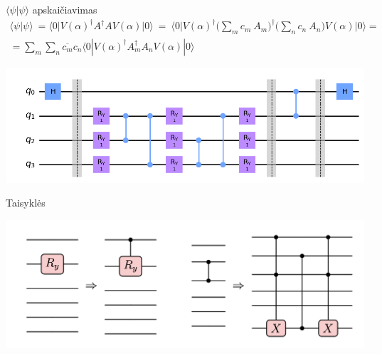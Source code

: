 \begin{frame}{$\langle \psi|\psi\rangle$ apskaičiavimas}
    \begin{gather}
        \langle \psi | \psi \rangle \ =  \langle 0 | V(\alpha)^{\dagger} A^{\dagger} A V(\alpha) |0\rangle \ = \ \langle 0 | V(\alpha)^{\dagger} \Big( \displaystyle\sum_{m} c_m \ A_m \Big)^{\dagger} \Big( \displaystyle\sum_{n} c_n \ A_n \Big) V(\alpha) |0\rangle = \nonumber \\ 
        = \sum_{m} \sum_{n} \overline{c_{m}} c_{n} \langle 0 | V(\alpha)^\dag A_{m}^\dag A_{n} V(\alpha)|0\rangle \nonumber
    \end{gather}
    \begin{center}
        \includegraphics[scale=0.6]{img/hadamardTest.png}
    \end{center}
\end{frame}

\begin{frame}{Taisyklės}
    \begin{center}
        \includegraphics[scale=0.3]{img/rules.png}
    \end{center}
\end{frame}

